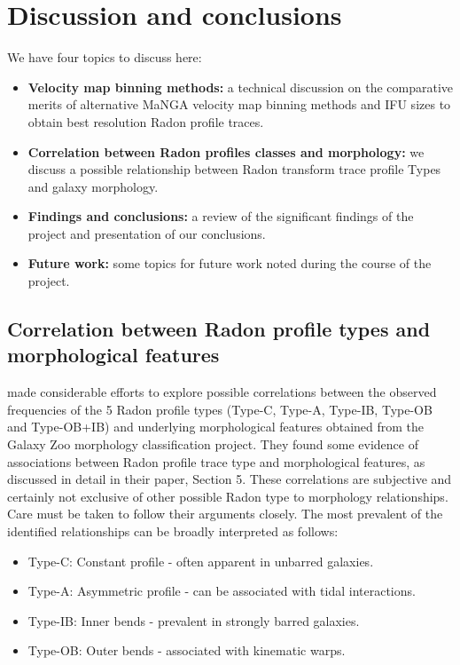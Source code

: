 \section{Discussion and conclusions}
\label{sec:discussion}
We have four topics to discuss here:
\begin{itemize}
\item \textbf{Velocity map binning methods:} a technical discussion on the comparative merits of alternative MaNGA velocity map binning methods and IFU sizes to obtain best resolution Radon profile traces.
\item \textbf{Correlation between Radon profiles classes and morphology:} we discuss a possible relationship between Radon transform trace profile Types and galaxy morphology.
\item \textbf{Findings and conclusions:} a review of the significant findings of the project and presentation of our conclusions.
\item \textbf{Future work:} some topics for future work noted during the course of the project. 
\end{itemize}



\subsection[Correlation between Radon profiles and morphology]{Correlation between Radon profile types and morphological features}
\label{correlations}
\cite{2018MNRAS.480.2217S} made considerable efforts to explore  possible correlations between the observed frequencies of the 5 Radon profile types (Type-C, Type-A, Type-IB, Type-OB and Type-OB+IB) and underlying morphological features obtained from the Galaxy Zoo morphology classification project. They found some evidence of associations between Radon profile trace type and morphological features, as discussed in detail in their paper, Section 5. These correlations are subjective and certainly not exclusive of other possible Radon type to morphology relationships. Care must be taken to follow their arguments closely. The most prevalent of the identified relationships can be broadly interpreted as follows:
\begin{itemize}
\item Type-C: Constant profile - often apparent in unbarred galaxies.
\item Type-A: Asymmetric profile - can be associated with tidal interactions.
\item Type-IB: Inner bends - prevalent in strongly barred galaxies.
\item Type-OB: Outer bends - associated with kinematic warps.
\end{itemize}

